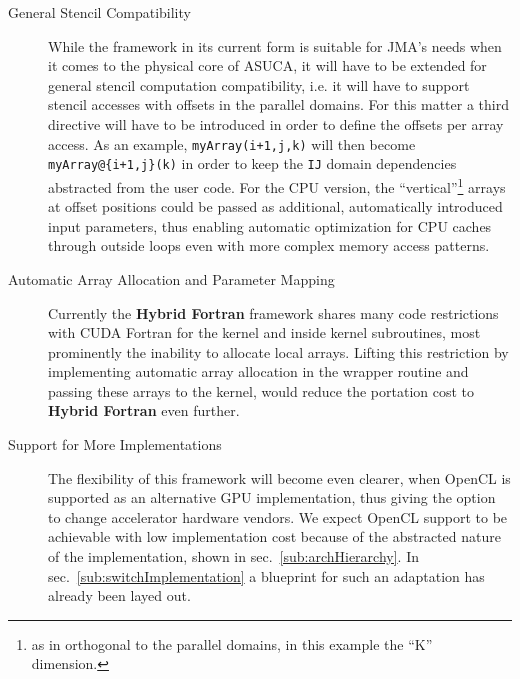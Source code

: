 \begin{description}
 \item [General Stencil Compatibility] While the framework in its current form is suitable for JMA's needs when it comes to the physical core of ASUCA, it will have to be extended for general stencil computation compatibility, i.e. it will have to support stencil accesses with offsets in the parallel domains. For this matter a third directive will have to be introduced in order to define the offsets per array access. As an example, \verb|myArray(i+1,j,k)| will then become \verb|myArray@{i+1,j}(k)| in order to keep the \verb|IJ| domain dependencies abstracted from the user code. For the CPU version, the ``vertical''\footnote{as in orthogonal to the parallel domains, in this example the ``K'' dimension.} arrays at offset positions could be passed as additional, automatically introduced input parameters, thus enabling automatic optimization for CPU caches through outside loops even with more complex memory access patterns.
 \item [Automatic Array Allocation and Parameter Mapping] Currently the \textbf{Hybrid Fortran} framework shares many code restrictions with CUDA Fortran for the kernel and inside kernel subroutines, most prominently the inability to allocate local arrays. Lifting this restriction by implementing automatic array allocation in the wrapper routine and passing these arrays to the kernel, would reduce the portation cost to \textbf{Hybrid Fortran} even further.
 \item [Support for More Implementations] The flexibility of this framework will become even clearer, when OpenCL is supported as an alternative GPU implementation, thus giving the option to change accelerator hardware vendors. We expect OpenCL support to be achievable with low implementation cost because of the abstracted nature of the implementation, shown in sec.~\ref{sub:archHierarchy}. In sec.~\ref{sub:switchImplementation} a blueprint for such an adaptation has already been layed out.
\end{description}